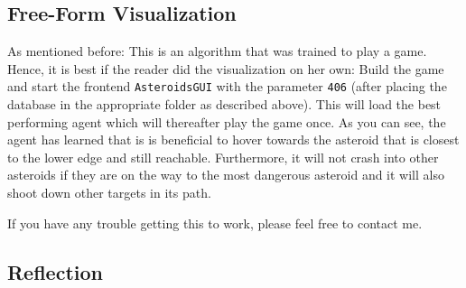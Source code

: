 \documentclass[a4paper,10pt]{article}
\begin{document}
\subsection{Free-Form Visualization}

As mentioned before: This is an algorithm that was trained to play a game.
Hence, it is best if the reader did the visualization on her own:
Build the game and start the frontend \texttt{AsteroidsGUI} with the parameter \texttt{406} (after placing the database in the appropriate folder as described above).
This will load the best performing agent which will thereafter play the game once.
As you can see, the agent has learned that is is beneficial to hover towards the asteroid that is closest to the lower edge and still reachable.
Furthermore, it will not crash into other asteroids if they are on the way to the most dangerous asteroid and it will also shoot down other targets in its path.

If you have any trouble getting this to work, please feel free to contact me.
\subsection{Reflection}
\end{document}
